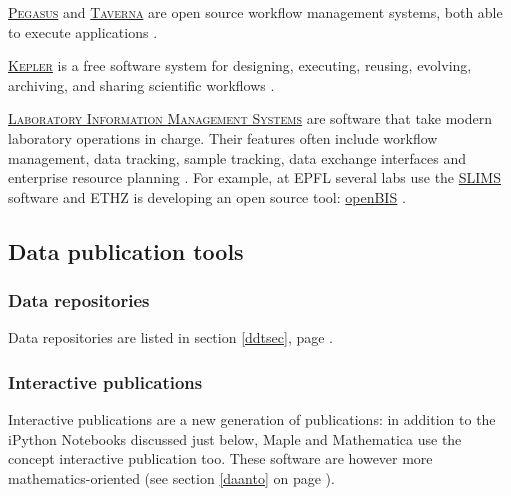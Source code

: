\vspace{0.4cm}

\noindent {}  \textsc{\href{http://pegasus.isi.edu/}{Pegasus}} and \textsc{\href{http://www.taverna.org.uk/}{Taverna}} are open source workflow management systems, both able to execute applications \cite{pegasus_pegasus_2015,taverna_taverna_2015}.

\vspace{0.4cm}

\noindent {} \textsc{\href{https://kepler-project.org/}{Kepler}} is a free software system for designing, executing, reusing, evolving, archiving, and sharing scientific workflows \cite{kepler-project.org_kepler_2015,kepler-project.org_kepler_2015-1}.

\vspace{0.4cm}

\noindent {}   \textsc{\href{https://en.wikipedia.org/wiki/Laboratory_information_management_system}{Laboratory Information Management Systems}} are software that take modern laboratory operations in charge. Their features often include workflow management, data tracking, sample tracking, data exchange interfaces and enterprise resource planning \cite{wikipedia_laboratory_2015}. For example, at EPFL several labs use the \href{http://sv-it.epfl.ch/slims}{SLIMS} software and ETHZ is developing an open source tool: \href{http://www.cisd.ethz.ch/software/openBIS}{openBIS} \cite{ethz_eth_2015,epfl_lsis_2015}.


\subsection{Data publication tools}

\subsubsection{Data repositories}

Data repositories are listed in section \ref{ddtsec}, page \pageref{ddtsec}.

\subsubsection{Interactive publications}

Interactive publications are a new generation of publications: in addition to the iPython Notebooks  discussed just below, Maple and Mathematica use the concept interactive publication too. These software are however more mathematics-oriented (see section \ref{daanto} on page \pageref{daanto}).


